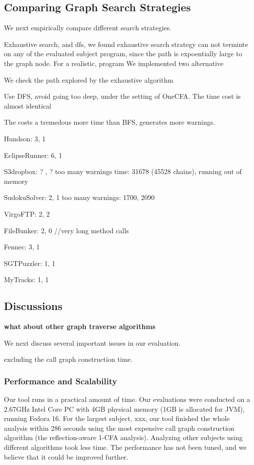 \subsection{Comparing Graph Search Strategies}
\label{sec:search}

We next empirically compare different search strategies.

Exhaustive search, and dfs, we found exhaustive search strategy
can not terminte on any of the evaluated subject program, since the
path is expoentially large to the graph node. For a realistic, program
We implemented two alternative

We check the path explored by the exhaustive algorithm

Use DFS, avoid going too deep, under the setting of OneCFA. The time cost
is almost identical

The costs a tremedous more time than BFS, generates more warnings.


Hundson: 3, 1

EclipseRunner: 6, 1

S3dropbox: ? , ?  too many warnings time: 31678 (45528 chains), running out of memory

SudokuSolver:  2, 1 too many warnings: 1700, 2090

VirgoFTP: 2, 2

FileBunker:  2, 0  //very long method calls

Fennec: 3, 1

SGTPuzzler: 1, 1

MyTracks: 1, 1

\subsection{Discussions}

\textbf{what about other graph traverse algorithms}

We next discuss several important issues in our evaluation.

excluding the call graph construction time.

\subsubsection{Performance and Scalability}

Our tool runs in a practical amount of time. Our evaluations
were conducted on a 2.67GHz Intel Core PC with 4GB
physical memory (1GB is allocated for JVM), running Fedora 16.
For the largest subject, xxx, our tool finished the whole analysis
within 286 seconds using the most expensive call graph construction
algorithm (the reflection-aware 1-CFA analysis). Analyzing
other subjects using different algorithms took less time.
The performance has not been tuned, and we believe
that it could be improved further.

